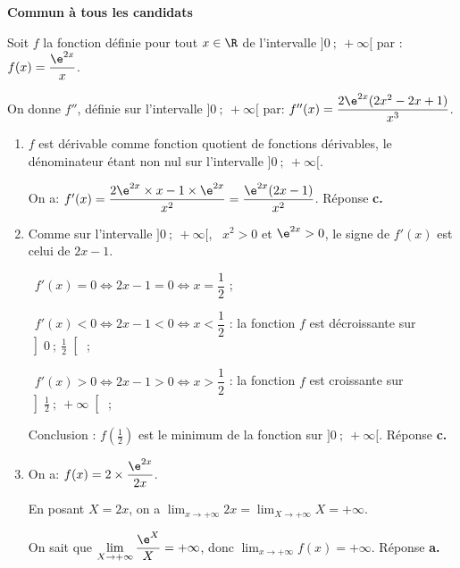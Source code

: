 \textbf{Commun à tous les candidats}

\medskip











Soit $f$ la fonction définie pour tout $x\in\R$ de l'intervalle $]0~;~ +\infty[$ par :
$ f(x) =\dfrac{\e^{2x}}{x}$.

On donne $f''$, définie sur l'intervalle $]0~;~ +\infty[$ par:
$f''(x)=\dfrac {2 \e^{2x} (2x^2-2x+1)}{x^3}$.

\smallskip

\begin{enumerate}
\item 
$f$ est dérivable comme fonction quotient de fonctions dérivables, le dénominateur étant non nul sur l'intervalle $]0~;~+\infty[$.

On a: $f'(x) = \dfrac{2\e^{2x} \times x - 1 \times \e^{2x}}{x^2} = \dfrac{\e^{2x}(2x - 1)}{x^2}$. \hfill{}Réponse \textbf{c.}





\item Comme sur l'intervalle $]0~;~+\infty[$, \, $x^2 > 0$ et $\e^{2x} > 0$, le signe de $f'(x)$ est celui de $2x - 1$.

\starredbullet~$f'(x)  = 0 \iff 2x - 1 = 0 \iff x = \dfrac{1}{2}$ ;

\starredbullet~$f'(x)  < 0 \iff 2x - 1 < 0 \iff x < \dfrac{1}{2}$ : la fonction $f$ est décroissante sur $\left]0~;~\frac{1}{2}\right[$ ;

\starredbullet~$f'(x)  > 0 \iff 2x - 1 > 0 \iff x > \dfrac{1}{2}$ : la fonction $f$ est croissante sur $\left]\frac{1}{2}~;~+ \infty\right[$ ;

Conclusion : $f\left(\frac{1}{2}\right)$ est le minimum de la fonction sur $]0~;~+ \infty[$.  
\hfill{}Réponse \textbf{c.}





\item   On a: $f(x) = 2 \times \dfrac{\e^{2x}}{2x}$.

En posant $X = 2x$, on a $\displaystyle\lim_{x \to + \infty} 2x = \displaystyle\lim_{X \to + \infty} X = + \infty$.

On sait que $\displaystyle\lim_{X \to + \infty} \dfrac{\e^X}{X} = + \infty$, donc $\displaystyle\lim_{x \to + \infty} f(x) = + \infty$. \hfill{}Réponse \textbf{a.}






\end{enumerate}
